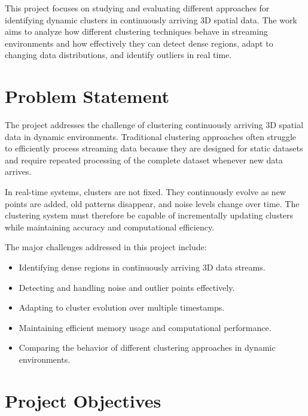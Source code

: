 \documentclass[12pt,a4paper]{report}
\begin{document}
This project focuses on studying and evaluating different approaches for identifying dynamic clusters in continuously arriving 3D spatial data. The work aims to analyze how different clustering techniques behave in streaming environments and how effectively they can detect dense regions, adapt to changing data distributions, and identify outliers in real time.

\section{Problem Statement}

The project addresses the challenge of clustering continuously arriving 3D spatial data in dynamic environments. Traditional clustering approaches often struggle to efficiently process streaming data because they are designed for static datasets and require repeated processing of the complete dataset whenever new data arrives.

In real-time systems, clusters are not fixed. They continuously evolve as new points are added, old patterns disappear, and noise levels change over time. The clustering system must therefore be capable of incrementally updating clusters while maintaining accuracy and computational efficiency.

The major challenges addressed in this project include:

\begin{itemize}

\item Identifying dense regions in continuously arriving 3D data streams.

\item Detecting and handling noise and outlier points effectively.

\item Adapting to cluster evolution over multiple timestamps.

\item Maintaining efficient memory usage and computational performance.

\item Comparing the behavior of different clustering approaches in dynamic environments.

\end{itemize}

\section{Project Objectives}
\end{document}
